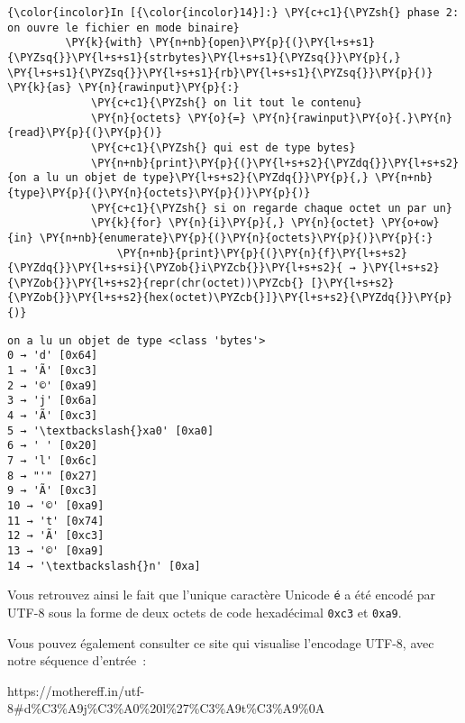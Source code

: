    \begin{Verbatim}[commandchars=\\\{\},frame=single,framerule=0.3mm,rulecolor=\color{cellframecolor}]
{\color{incolor}In [{\color{incolor}14}]:} \PY{c+c1}{\PYZsh{} phase 2: on ouvre le fichier en mode binaire}
         \PY{k}{with} \PY{n+nb}{open}\PY{p}{(}\PY{l+s+s1}{\PYZsq{}}\PY{l+s+s1}{strbytes}\PY{l+s+s1}{\PYZsq{}}\PY{p}{,} \PY{l+s+s1}{\PYZsq{}}\PY{l+s+s1}{rb}\PY{l+s+s1}{\PYZsq{}}\PY{p}{)} \PY{k}{as} \PY{n}{rawinput}\PY{p}{:}
             \PY{c+c1}{\PYZsh{} on lit tout le contenu}
             \PY{n}{octets} \PY{o}{=} \PY{n}{rawinput}\PY{o}{.}\PY{n}{read}\PY{p}{(}\PY{p}{)}
             \PY{c+c1}{\PYZsh{} qui est de type bytes}
             \PY{n+nb}{print}\PY{p}{(}\PY{l+s+s2}{\PYZdq{}}\PY{l+s+s2}{on a lu un objet de type}\PY{l+s+s2}{\PYZdq{}}\PY{p}{,} \PY{n+nb}{type}\PY{p}{(}\PY{n}{octets}\PY{p}{)}\PY{p}{)}
             \PY{c+c1}{\PYZsh{} si on regarde chaque octet un par un}
             \PY{k}{for} \PY{n}{i}\PY{p}{,} \PY{n}{octet} \PY{o+ow}{in} \PY{n+nb}{enumerate}\PY{p}{(}\PY{n}{octets}\PY{p}{)}\PY{p}{:}
                 \PY{n+nb}{print}\PY{p}{(}\PY{n}{f}\PY{l+s+s2}{\PYZdq{}}\PY{l+s+si}{\PYZob{}i\PYZcb{}}\PY{l+s+s2}{ → }\PY{l+s+s2}{\PYZob{}}\PY{l+s+s2}{repr(chr(octet))\PYZcb{} [}\PY{l+s+s2}{\PYZob{}}\PY{l+s+s2}{hex(octet)\PYZcb{}]}\PY{l+s+s2}{\PYZdq{}}\PY{p}{)}
\end{Verbatim}


    \begin{Verbatim}[commandchars=\\\{\},frame=single,framerule=0.3mm,rulecolor=\color{cellframecolor}]
on a lu un objet de type <class 'bytes'>
0 → 'd' [0x64]
1 → 'Ã' [0xc3]
2 → '©' [0xa9]
3 → 'j' [0x6a]
4 → 'Ã' [0xc3]
5 → '\textbackslash{}xa0' [0xa0]
6 → ' ' [0x20]
7 → 'l' [0x6c]
8 → "'" [0x27]
9 → 'Ã' [0xc3]
10 → '©' [0xa9]
11 → 't' [0x74]
12 → 'Ã' [0xc3]
13 → '©' [0xa9]
14 → '\textbackslash{}n' [0xa]
\end{Verbatim}

    Vous retrouvez ainsi le fait que l'unique caractère Unicode \texttt{é} a
été encodé par UTF-8 sous la forme de deux octets de code hexadécimal
\texttt{0xc3} et \texttt{0xa9}.

    Vous pouvez également consulter ce site qui visualise l'encodage UTF-8,
avec notre séquence d'entrée~:

https://mothereff.in/utf-8\#d\%C3\%A9j\%C3\%A0\%20l\%27\%C3\%A9t\%C3\%A9\%0A

